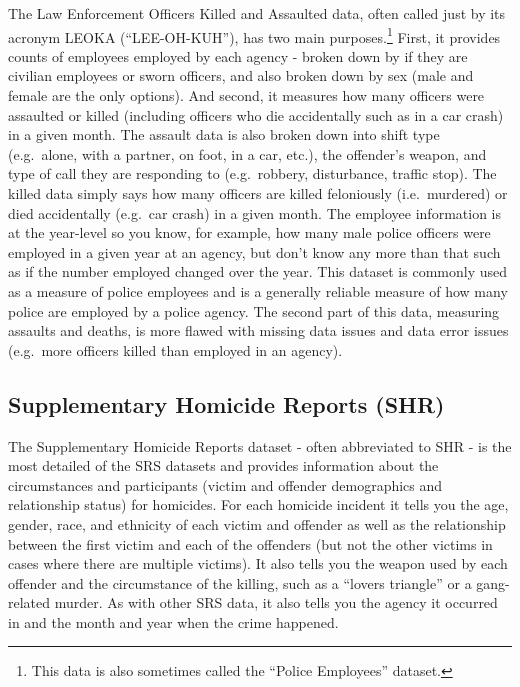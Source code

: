 \documentclass[
]{krantz}
\begin{document}
The Law Enforcement Officers Killed and Assaulted data,
often called just by its acronym LEOKA (``LEE-OH-KUH''), has
two main purposes.\footnote{This data is also sometimes
  called the ``Police Employees'' dataset.} First, it
provides counts of employees employed by each agency -
broken down by if they are civilian employees or sworn
officers, and also broken down by sex (male and female are
the only options). And second, it measures how many officers
were assaulted or killed (including officers who die
accidentally such as in a car crash) in a given month. The
assault data is also broken down into shift type
(e.g.~alone, with a partner, on foot, in a car, etc.), the
offender's weapon, and type of call they are responding to
(e.g.~robbery, disturbance, traffic stop). The killed data
simply says how many officers are killed feloniously
(i.e.~murdered) or died accidentally (e.g.~car crash) in a
given month. The employee information is at the year-level
so you know, for example, how many male police officers were
employed in a given year at an agency, but don't know any
more than that such as if the number employed changed over
the year. This dataset is commonly used as a measure of
police employees and is a generally reliable measure of how
many police are employed by a police agency. The second part
of this data, measuring assaults and deaths, is more flawed
with missing data issues and data error issues (e.g.~more
officers killed than employed in an agency).

\subsection{Supplementary Homicide Reports
(SHR)}\label{supplementary-homicide-reports-shr}

The Supplementary Homicide Reports dataset - often
abbreviated to SHR - is the most detailed of the SRS
datasets and provides information about the circumstances
and participants (victim and offender demographics and
relationship status) for homicides. For each homicide
incident it tells you the age, gender, race, and ethnicity
of each victim and offender as well as the relationship
between the first victim and each of the offenders (but not
the other victims in cases where there are multiple
victims). It also tells you the weapon used by each offender
and the circumstance of the killing, such as a ``lovers
triangle'' or a gang-related murder. As with other SRS data,
it also tells you the agency it occurred in and the month
and year when the crime happened.
\end{document}
